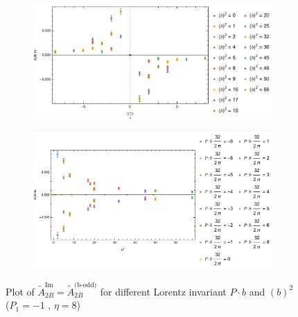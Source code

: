\documentclass[]{article}
\numberwithin{equation}{section}
\newcommand{\tAmp}{\widetilde{A}}
\newcommand{\tAmp}{\ensuremath{\widetilde{A}^{(+)}}}
\begin{document}
\begin{figure}[h!]
     \centering
     \begin{subfigure}[b]{0.45\textwidth}
         \centering
         \includegraphics[width=\textwidth]{Amp_plots/bP_A2B_b_odd_P1_-1_eta_8.pdf}
     \end{subfigure}
     \begin{subfigure}[b]{0.45\textwidth}
         \centering
         \includegraphics[width=\textwidth]{Amp_plots/bsq_A2B_b_odd_P1_-1_eta_8.pdf}
     \end{subfigure}
        \caption{Plot of $\tAmp^{\text{Im}}_{2B}=\tAmp^{\text{(b-odd)}}_{2B}$ for different Lorentz invariant $P\cdot b$ and $(b)^2$  ($P_{1} = -1$ , $\eta=8$)}
\end{figure}
\end{document}

